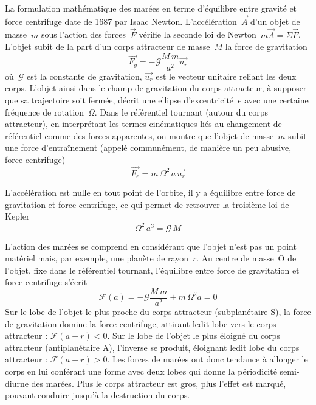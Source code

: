 \sk
La formulation mathématique des marées en terme d'équilibre entre gravité et force centrifuge date de 1687 par Isaac Newton. L'accélération~$\vec{A}$ d'un objet de masse~$m$ sous l'action des forces~$\vec{F}$ vérifie la seconde loi de Newton~$m \vec{A} = \Sigma \vec{F}$. L'objet subit de la part d'un corps attracteur de masse~$M$ la force de gravitation
\[ \vec{F_g} = -\mathcal{G} \frac{M\,m}{a^2} \vec{u_r} \]
\noindent où~$\mathcal{G}$ est la constante de gravitation, $\vec{u_r}$ est le vecteur unitaire reliant les deux corps. 
\sk
L'objet ainsi dans le champ de gravitation du corps attracteur, à supposer que sa trajectoire soit fermée, décrit une ellipse d'excentricité~$e$ avec une certaine fréquence de rotation~$\Omega$. Dans le référentiel tournant (autour du corps attracteur), en interprétant les termes cinématiques liés au changement de référentiel comme des forces apparentes, on montre que l'objet de masse~$m$ subit une force d'entraînement (appelé communément, de manière un peu abusive, force centrifuge)
\[ \vec{F_e} = m \, \Omega^2 \, a \, \vec{u_r} \]

\sk
L'accélération est nulle en tout point de l'orbite, il y a équilibre entre force de gravitation et force centrifuge, ce qui permet de retrouver la troisième loi de Kepler
\[ \Omega^2 \, a^3 = \mathcal{G} \, M  \]

\sk
L'action des marées se comprend en considérant que l'objet n'est pas un point matériel mais, par exemple, une planète de rayon~$r$. Au centre de masse~O de l'objet, fixe dans le référentiel tournant, l'équilibre entre force de gravitation et force centrifuge s'écrit
\[ \mathcal{F}(a) = -\mathcal{G} \frac{M\,m}{a^2} + m \, \Omega^2 a = 0 \]
Sur le lobe de l'objet le plus proche du corps attracteur (subplanétaire S), la force de gravitation domine la force centrifuge, attirant ledit lobe vers le corps attracteur : $\mathcal{F}(a-r) < 0$. Sur le lobe de l'objet le plus éloigné du corps attracteur (antiplanétaire A), l'inverse se produit, éloignant ledit lobe du corps attracteur : $\mathcal{F}(a+r) > 0$. Les forces de marées ont donc tendance à allonger le corps en lui conférant une forme avec deux lobes qui donne la périodicité semi-diurne des marées. Plus le corps attracteur est gros, plus l'effet est marqué, pouvant conduire jusqu'à la destruction du corps.


